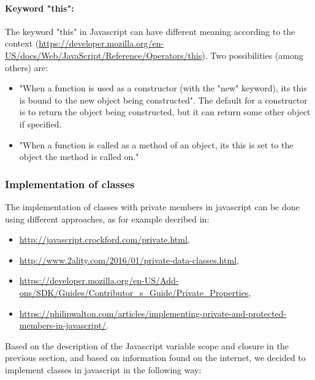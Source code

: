  \paragraph{Keyword "this":}
The keyword "this" in Javascript can have different meaning according to the
context
(\url{https://developer.mozilla.org/en-US/docs/Web/JavaScript/Reference/Operators/this}).
Two possibilities (among others) are:
\begin{itemize}
  \item "When a function is used as a constructor (with the "new" keyword), its this is bound 
to the new object being constructed". The default for a constructor is to return
the object being constructed, but it can return some other object if specified.
  \item "When a function is called as a method of an object, its this is set to 
        the object the method is called on."
\end{itemize}


\subsubsection{Implementation of classes}

The implementation of classes with private members in javascript can be
done using different approaches, as for example decribed in:
\begin{itemize}
 \item \url{http://javascript.crockford.com/private.html}, 
 \item \url{http://www.2ality.com/2016/01/private-data-classes.html},
 \item \url{https://developer.mozilla.org/en-US/Add-ons/SDK/Guides/Contributor_s_Guide/Private_Properties},
 \item \url{https://philipwalton.com/articles/implementing-private-and-protected-members-in-javascript/}.
\end{itemize}

Based on the description of the Javascript variable scope and closure in the previous section,
and based on information found on the internet, we decided to implement classes in
javascript in the following way:

%


